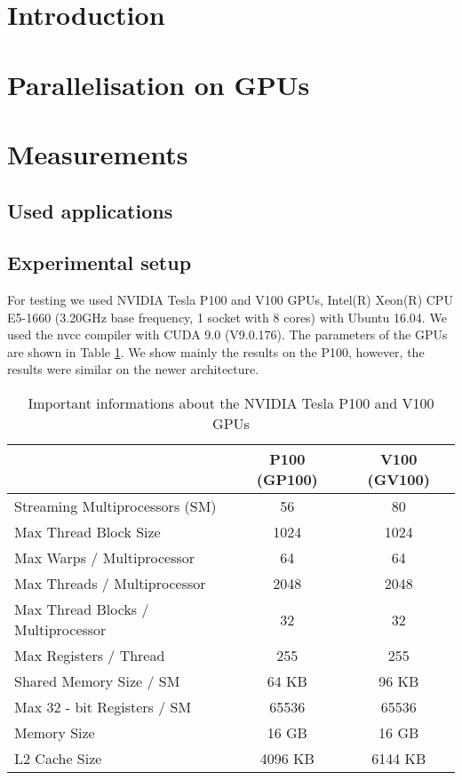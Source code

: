 \section{Introduction}\label{introduction}



\section{Parallelisation on GPUs}\label{parallelisation-on-gpu}



\section{Measurements}\label{measurements}

\subsection{Used applications}\label{used-applications}


\subsection{Experimental setup}\label{experimental-setup}
For testing we used NVIDIA Tesla P100 and V100 GPUs, Intel(R) Xeon(R) CPU
E5-1660 (3.20GHz base frequency, 1 socket with 8 cores) with Ubuntu 16.04. We
used the nvcc compiler with CUDA 9.0 (V9.0.176). The parameters of the GPUs
are shown in Table \ref{tab:GPU_datasheet}. We show mainly the results on the
P100, however, the results were similar on the newer architecture.
\begin{table}
\centering
\begin{tabular}{|l|c|c|}
\hline
  & P100 (GP100) & V100 (GV100)\\ \hline
  Streaming Multiprocessors (SM) 		& 56	& 80\\ \hline
  Max Thread Block Size				& 1024	& 1024 \\ \hline
  Max Warps / Multiprocessor 			& 64 & 64	\\ \hline
  Max Threads / Multiprocessor		& 2048 & 2048	\\ \hline
  Max Thread Blocks / Multiprocessor 	& 32 & 32	\\ \hline
  Max Registers / Thread& 255 & 255	\\ \hline
  Shared Memory Size / SM	& 64 KB & 96 KB	\\ \hline
  Max 32 - bit Registers / SM			& 65536 & 65536\\ \hline
  Memory Size							& 16 GB	& 16 GB\\ \hline
  L2 Cache Size						& 4096 KB & 6144 KB\\ \hline
\end{tabular}
  \caption{Important informations about the NVIDIA Tesla P100 and V100 GPUs
  \cite{Pascal_whitepaper, Volta_whitepaper}}
\label{tab:GPU_datasheet}
\end{table}

